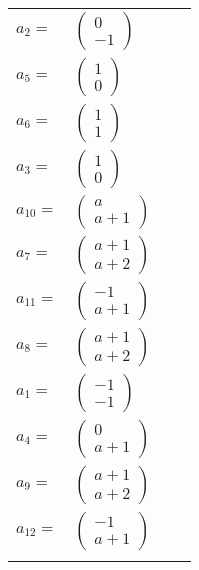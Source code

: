 \documentclass[1p]{elsarticle_modified}
\theoremstyle{definition}
\begin{document}
\begin{tabular}{m{7pt} m{180pt} m{7pt} m{180pt} }
\flushright $a_{2}=$&$\begin{pmatrix}0\\-1\end{pmatrix}$ \\
\flushright $a_{5}=$&$\begin{pmatrix}1\\0\end{pmatrix}$ \\
\flushright $a_{6}=$&$\begin{pmatrix}1\\1\end{pmatrix}$ \\
\flushright $a_{3}=$&$\begin{pmatrix}1\\0\end{pmatrix}$ \\
\flushright $a_{10}=$&$\begin{pmatrix}a\\a+1\end{pmatrix}$ \\
\flushright $a_{7}=$&$\begin{pmatrix}a+1\\a+2\end{pmatrix}$ \\
\flushright $a_{11}=$&$\begin{pmatrix}-1\\a+1\end{pmatrix}$ \\
\flushright $a_{8}=$&$\begin{pmatrix}a+1\\a+2\end{pmatrix}$ \\
\flushright $a_{1}=$&$\begin{pmatrix}-1\\-1\end{pmatrix}$ \\
\flushright $a_{4}=$&$\begin{pmatrix}0\\a+1\end{pmatrix}$ \\
\flushright $a_{9}=$&$\begin{pmatrix}a+1\\a+2\end{pmatrix}$ \\
\flushright $a_{12}=$&$\begin{pmatrix}-1\\a+1\end{pmatrix}$\\&\end{tabular}
\end{document}
